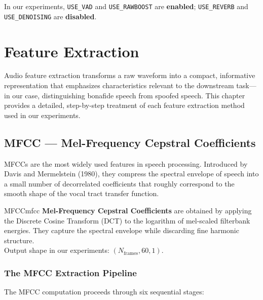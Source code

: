 \documentclass[12pt]{report}
\begin{document}
\begin{notebox}
    In our experiments, \texttt{USE\_VAD} and \texttt{USE\_RAWBOOST} are \textbf{enabled};
    \texttt{USE\_REVERB} and \texttt{USE\_DENOISING} are \textbf{disabled}.
\end{notebox}


\chapter{Feature Extraction}

Audio feature extraction transforms a raw waveform into a compact, informative representation
that emphasizes characteristics relevant to the downstream task---in our case, distinguishing
bonafide speech from spoofed speech. This chapter provides a detailed, step-by-step treatment
of each feature extraction method used in our experiments.


\section{MFCC --- Mel-Frequency Cepstral Coefficients}

MFCCs are the most widely used features in speech processing. Introduced by Davis and
Mermelstein (1980), they compress the spectral envelope of speech into a small number of
decorrelated coefficients that roughly correspond to the smooth shape of the vocal tract
transfer function.

\begin{dfnbox}{MFCC}{mfcc}
    \textbf{Mel-Frequency Cepstral Coefficients} are obtained by applying the Discrete Cosine
    Transform (DCT) to the logarithm of mel-scaled filterbank energies. They capture the
    spectral envelope while discarding fine harmonic structure. \\
    Output shape in our experiments: $(N_\text{frames}, 60, 1)$.
\end{dfnbox}

\subsection{The MFCC Extraction Pipeline}

The MFCC computation proceeds through six sequential stages:
\end{document}
